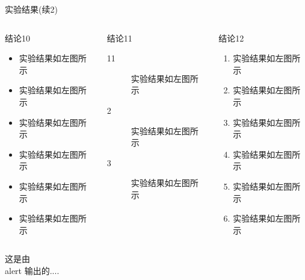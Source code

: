 \documentclass[8pt,compress,t,notheorems,noamsthm,notheorem,xcolor=x11names]{beamer}
\theoremstyle{nonumberplain}%
\theoremstyle{plain}
\begin{document}
\begin{frame}{实验结果(续2)}
\begin{columns}[T,onlytextwidth]
	
	\begin{column}{0.30\textwidth}
		\begin{alertblock}{结论10}
			\begin{itemize}
				\item 实验结果如左图所示
				\item 实验结果如左图所示
				\item 实验结果如左图所示
				\item 实验结果如左图所示
				\item 实验结果如左图所示
				\item 实验结果如左图所示
			\end{itemize}
		\end{alertblock}
	\end{column}
	
	\begin{column}{0.30\textwidth}
		\begin{alertblock}{结论11}
			\begin{description}
				\item[11] 实验结果如左图所示
				\item[2] 实验结果如左图所示
				\item[3] 实验结果如左图所示
				
			\end{description}
		\end{alertblock}
	\end{column}
	
	\begin{column}{0.30\textwidth}
		\begin{alertblock}{结论12}
			\begin{enumerate}
				\item 实验结果如左图所示
				\item 实验结果如左图所示
				\item 实验结果如左图所示
				\item 实验结果如左图所示
				\item 实验结果如左图所示
				\item 实验结果如左图所示
			\end{enumerate}
		\end{alertblock}
	\end{column}
\end{columns}

\alert{这是由 \\ alert 输出的....}

\end{frame}
\end{document}
